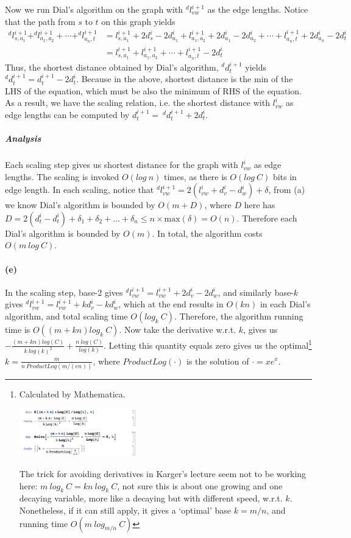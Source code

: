 \documentclass[12pt]{article}
\begin{document}
Now we run Dial's algorithm on the graph with $^d l^{i+1}_{vw}$ as the edge lengths. Notice that the path from $s$ to $t$ on this graph yields 
\begin{align*}
^d l_{s,a_1}^{i+1} + ^d l_{a_1,a_2}^{i+1} + \cdots + ^dl_{a_n, t}^{i+1} &= l_{s,a_1}^{i+1} + 2d^i_s - 2d^i_{a_1} + l_{a_1,a_2}^{i+1} + 2d^i_{a_1} - 2d^i_{a_2} + \cdots + l_{a_n, t}^{i+1} + 2d^i_{a_n} - 2d^i_t\\
&= l_{s,a_1}^{i+1} + l_{a_1,a_2}^{i+1} + \cdots + l_{a_n, t}^{i+1} - 2d^i_t
\end{align*}
Thus, the shortest distance obtained by Dial's algorithm, $^d d^{i+1}_t$ yields $^d d^{i+1}_t = d^{i+1}_t - 2d^i_t$. Because in the above, shortest distance is the min of the LHS of the equation, which must be also the minimum of RHS of the equation. As a result, we have the scaling relation, i.e. the shortest distance with $l_{vw}^i$ as edge lengths can be computed by $d^{i+1}_t = \:^dd^{i+1}_t + 2d^i_t$.

\subparagraph{Analysis} Each scaling step gives us shortest distance for the graph with $l_{vw}^i$ as edge lengths. The scaling is invoked $O(log\:n)$ times, as there is $O(log\:C)$ bits in edge length. In each scaling, notice that $^d l^{i+1}_{vw} =2(l^{i}_{vw} + d^i_v - d^i_w) + \delta$, from (a) we know Dial's algorithm is bounded by $O(m + D)$, where $D$ here has $D = 2(d^i_t - d^i_t) + \delta_1 + \delta_2 + ... + \delta_n \leq n\times \text{max}(\delta) = O(n)$. Therefore each Dial's algorithm is bounded by $O(m)$. In total, the algorithm costs $O(m\:log\:C)$.

\paragraph{(e)} In the scaling step, base-2 gives $^d l^{i+1}_{vw} = l^{i+1}_{vw} + 2d^i_v - 2d^i_w$, and similarly base-$k$ gives $^d l^{i+1}_{vw} = l^{i+1}_{vw} + kd^i_v - kd^i_w$, which at the end results in $O(kn)$ in each Dial's algorithm, and total scaling time $O(log_k\:C)$. Therefore, the algorithm running time is $O((m+kn)log_k\:C)$. Now take the derivative w.r.t. $k$, gives us $-\frac{(m+kn)log(C)}{k\:log(k)^2} + \frac{n\:log(C)}{log(k)}$. Letting this quantity equals zero gives us the optimal\footnote{Calculated by Mathematica. 

\includegraphics[width=0.4\textwidth]{3-e.png} \label{fig:3-e}

The trick for avoiding derivatives in Karger's lecture seem not to be working here: $m\:log_k\:C = kn\:log_k\:C$, not sure this is about one growing and one decaying variable, more like a decaying but with different speed, w.r.t. $k$. Nonetheless, if it can still apply, it gives a `optimal' base $k = m/n$, and running time $O(m\:log_{m/n}\:C)$} $k=\frac{m}{n\:ProductLog(m/(en))}$, where $ProductLog(\cdot)$ is the solution of $\cdot = xe^x$.
\pagebreak
\end{document}
